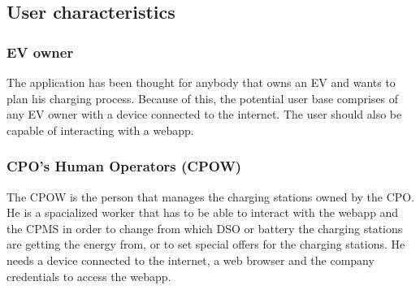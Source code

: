 \documentclass[table, 12pt]{article} %
\begin{document}
    \newpage
    \subsection{User characteristics}
    \subsubsection{EV owner}
    The application has been thought for anybody that owns an EV and wants to plan his charging process. 
    Because of this, the potential user base comprises of any EV owner with a device connected to the internet.
    The user should also be capable of interacting with a webapp.
    
    \subsubsection{CPO's Human Operators (CPOW)}
    The CPOW is the person that manages the charging stations owned by the CPO.\\
    He is a spacialized worker that has to be able to interact with the webapp and the CPMS in order to change from which DSO or battery the charging stations are getting the energy from, or to set special offers for the charging stations.
    He needs a device connected to the internet, a web browser and the company credentials to access the webapp.
\end{document}
